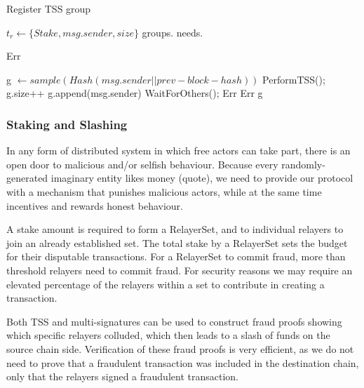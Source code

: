     	\begin{algorithm}[H]
			\caption{Register TSS group}
			\begin{algorithmic}[1]
				\Require $t_r \gets \{Stake, msg.sender, size\}$
				\Require groups.  
				\Require needs.
				
				    \State \Return Err
				\EndIf
				
				    \State g $\gets sample(Hash(msg.sender || prev-block-hash))$ 
				        \State PerformTSS();
				    \Else
				        \State g.size++
				        \State g.append(msg.sender)
				        \State WaitForOthers();
				        \Else
				    	\State \Return Err
				    	\EndIf
				    \EndIf
				\Else
				\State \Return Err
				\EndIf
				\State \Return g
			\end{algorithmic}
			\label{alg:register_TSS}
		\end{algorithm}

\subsubsection*{Staking and Slashing}
In any form of distributed system in which free actors can take part, there is an open door to malicious and/or selfish behaviour. Because every randomly-generated imaginary entity likes money (quote), we need to provide our protocol with a mechanism that punishes malicious actors, while at the same time incentives and rewards honest behaviour.

A stake amount is required to form a RelayerSet, and to individual relayers to join an already established set. The total stake by a RelayerSet sets the budget for their disputable transactions. For a RelayerSet to commit fraud, more than threshold relayers need to commit fraud. For security reasons we may require an elevated percentage of the relayers within a set to contribute in creating a transaction. 

Both TSS and multi-signatures can be used to construct fraud proofs showing which specific relayers colluded, which then leads to a slash of funds on the source chain side. Verification of these fraud proofs is very efficient, as we do not need to prove that a fraudulent transaction was included in the destination chain, only that the relayers signed a fraudulent transaction.


